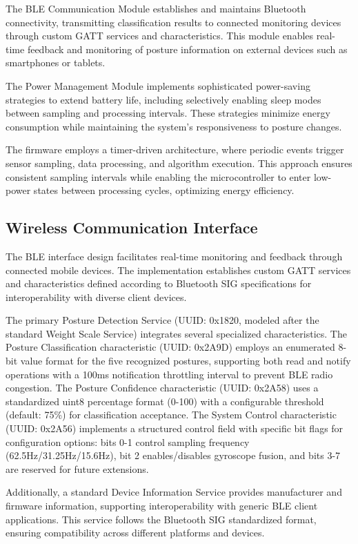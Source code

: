 \documentclass[
  9pt,
  letterpaper,
  abstract,
  titlepage]{scrbook}
\begin{document}
The BLE Communication Module establishes and maintains Bluetooth
connectivity, transmitting classification results to connected
monitoring devices through custom GATT services and characteristics.
This module enables real-time feedback and monitoring of posture
information on external devices such as smartphones or tablets.

The Power Management Module implements sophisticated power-saving
strategies to extend battery life, including selectively enabling sleep
modes between sampling and processing intervals. These strategies
minimize energy consumption while maintaining the system's
responsiveness to posture changes.

The firmware employs a timer-driven architecture, where periodic events
trigger sensor sampling, data processing, and algorithm execution. This
approach ensures consistent sampling intervals while enabling the
microcontroller to enter low-power states between processing cycles,
optimizing energy efficiency.

\subsection{Wireless Communication
Interface}\label{wireless-communication-interface}

The BLE interface design facilitates real-time monitoring and feedback
through connected mobile devices. The implementation establishes custom
GATT services and characteristics defined according to Bluetooth SIG
specifications for interoperability with diverse client devices.

The primary Posture Detection Service (UUID: 0x1820, modeled after the
standard Weight Scale Service) integrates several specialized
characteristics. The Posture Classification characteristic (UUID:
0x2A9D) employs an enumerated 8-bit value format for the five recognized
postures, supporting both read and notify operations with a 100ms
notification throttling interval to prevent BLE radio congestion. The
Posture Confidence characteristic (UUID: 0x2A58) uses a standardized
uint8 percentage format (0-100) with a configurable threshold (default:
75\%) for classification acceptance. The System Control characteristic
(UUID: 0x2A56) implements a structured control field with specific bit
flags for configuration options: bits 0-1 control sampling frequency
(62.5Hz/31.25Hz/15.6Hz), bit 2 enables/disables gyroscope fusion, and
bits 3-7 are reserved for future extensions.

Additionally, a standard Device Information Service provides
manufacturer and firmware information, supporting interoperability with
generic BLE client applications. This service follows the Bluetooth SIG
standardized format, ensuring compatibility across different platforms
and devices.
\end{document}
